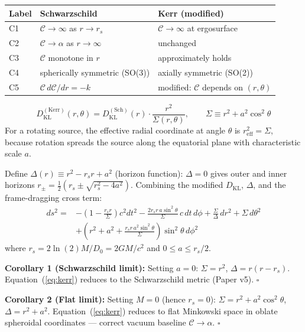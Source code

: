 \documentclass[12pt, a4paper]{article}
\begin{document}
\begin{center}
\renewcommand{\arraystretch}{1.3}
\begin{tabular}{p{1cm} p{5.5cm} p{5.5cm}}
\toprule
\textbf{Label} & \textbf{Schwarzschild} & \textbf{Kerr (modified)} \\
\midrule
C1 & $\mathcal{C}\to\infty$ as $r\to r_s$ & $\mathcal{C}\to\infty$ at ergosurface \\
C2 & $\mathcal{C}\to\alpha$ as $r\to\infty$ & unchanged \\
C3 & $\mathcal{C}$ monotone in $r$ & approximately holds \\
C4 & spherically symmetric (SO(3)) & axially symmetric (SO(2)) \\
C5 & $\mathcal{C}\,d\mathcal{C}/dr = -k$ & modified: $\mathcal{C}$ depends on $(r,\theta)$ \\
\bottomrule
\end{tabular}
\end{center}

\begin{derivedbox}[title={Modified $D_{\mathrm{KL}}$ for Rotating Source}]
\[
  D_{\mathrm{KL}}^{(\mathrm{Kerr})}(r,\theta)
  = D_{\mathrm{KL}}^{(\mathrm{Sch})}(r)\cdot\frac{r^2}{\Sigma(r,\theta)},
  \qquad \Sigma \equiv r^2 + a^2\cos^2\theta
\]
For a rotating source, the effective radial coordinate at angle $\theta$ is
$r^2_{\mathrm{eff}} = \Sigma$, because rotation spreads the source along the equatorial
plane with characteristic scale $a$.
\end{derivedbox}

\begin{keybox}[title={Kerr Metric from CRF --- Boyer--Lindquist Coordinates (Hypothesis)}]
Define $\Delta(r) \equiv r^2 - r_s r + a^2$ (horizon function): $\Delta = 0$ gives
outer and inner horizons $r_\pm = \tfrac{1}{2}(r_s \pm \sqrt{r_s^2 - 4a^2})$.
Combining the modified $D_{\mathrm{KL}}$, $\Delta$, and the frame-dragging cross term:
{\small
\begin{equation}
\begin{split}
  ds^2 = &-\!\left(1-\frac{r_s r}{\Sigma}\right)c^2 dt^2
  - \frac{2r_s r\,a\sin^2\theta}{\Sigma}\,c\,dt\,d\phi
  + \frac{\Sigma}{\Delta}\,dr^2 + \Sigma\,d\theta^2\\
  &+ \left(r^2 + a^2 + \frac{r_s r\,a^2\sin^2\theta}{\Sigma}\right)\sin^2\theta\,d\phi^2
\end{split}
  \label{eq:kerr}
\end{equation}
}
where $r_s = 2\ln(2)M/D_0 = 2GM/c^2$ and $0 \leq a \leq r_s/2$.

\textbf{Corollary 1 (Schwarzschild limit):} Setting $a = 0$: $\Sigma = r^2$,
$\Delta = r(r-r_s)$. Equation~(\ref{eq:kerr}) reduces to the Schwarzschild metric
(Paper v5). $\square$

\textbf{Corollary 2 (Flat limit):} Setting $M = 0$ (hence $r_s = 0$): $\Sigma = r^2+a^2\cos^2\theta$,
$\Delta = r^2+a^2$. Equation~(\ref{eq:kerr}) reduces to flat Minkowski space in oblate
spheroidal coordinates --- correct vacuum baseline $\mathcal{C}\to\alpha$. $\square$
\end{keybox}
\end{document}
